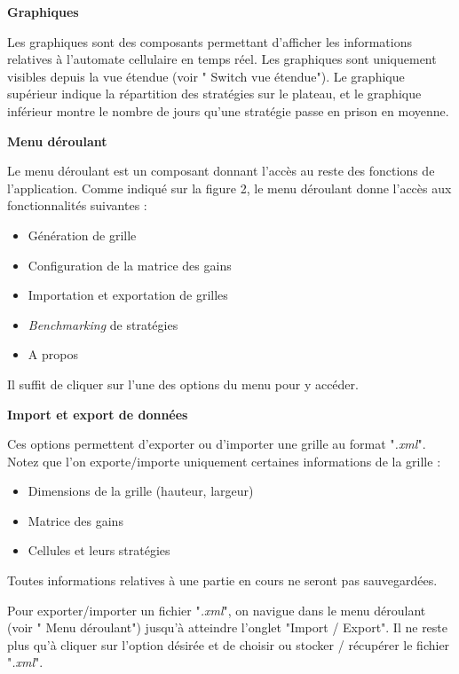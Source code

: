 \documentclass[a4paper, french]{article}
\newcommand*\circled[1]{\tikz[baseline=(char.base)]{
                \node[shape=circle,thick,draw,inner sep=2pt] (char) {\textbf{#1}};}
            }
\newcommand*\tinycircled[1]{\tikz[baseline=(char.base)]{
                \node[shape=circle,draw,inner sep=1pt] (char) {\footnotesize{#1}};}
            }
\begin{document}
\vspace{0.5cm}
\textbf{\circled{10} Graphiques}

Les graphiques sont des composants permettant d'afficher les informations relatives à l'automate cellulaire en temps réel. Les graphiques sont uniquement visibles depuis la vue étendue (voir "\tinycircled{9} Switch vue étendue"). Le graphique supérieur indique la répartition des stratégies sur le plateau, et le graphique inférieur montre le nombre de jours qu'une stratégie passe en prison en moyenne.

\pagebreak
\textbf{\circled{12} Menu déroulant}

Le menu déroulant est un composant donnant l'accès au reste des fonctions de l'application. Comme indiqué sur la figure 2, le menu déroulant donne l'accès aux fonctionnalités suivantes :

\begin{itemize}
    \item Génération de grille
    \item Configuration de la matrice des gains
    \item Importation et exportation de grilles
    \item \textit{Benchmarking} de stratégies
    \item A propos
\end{itemize}

Il suffit de cliquer sur l'une des options du menu pour y accéder.



\vspace{0.5cm}
\textbf{\circled{13} Import et export de données}

Ces options permettent d'exporter ou d'importer une grille au format "\textit{.xml}". Notez que l'on exporte/importe uniquement certaines informations de la grille :

\begin{itemize}
    \item Dimensions de la grille (hauteur, largeur)
    \item Matrice des gains
    \item Cellules et leurs stratégies
\end{itemize}

Toutes informations relatives à une partie en cours ne seront pas sauvegardées.

Pour exporter/importer un fichier "\textit{.xml}", on navigue dans le menu déroulant (voir "\tinycircled{12} Menu déroulant") jusqu'à atteindre l'onglet "Import / Export". Il ne reste plus qu'à cliquer sur l'option désirée et de choisir ou stocker / récupérer le fichier "\textit{.xml}".
\end{document}
